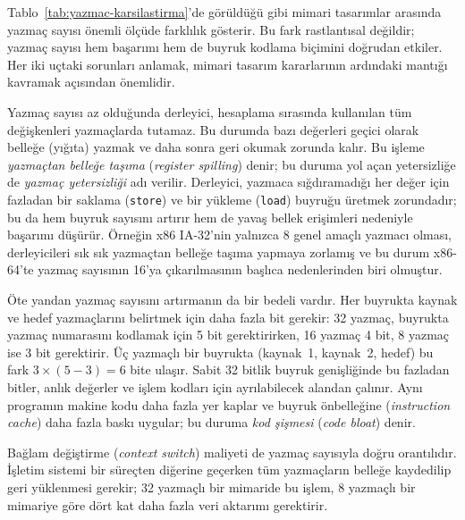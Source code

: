 Tablo~\ref{tab:yazmac-karsilastirma}'de görüldüğü gibi mimari tasarımlar arasında yazmaç sayısı önemli ölçüde farklılık gösterir. Bu fark rastlantısal değildir; yazmaç sayısı hem başarımı hem de buyruk kodlama biçimini doğrudan etkiler. Her iki uçtaki sorunları anlamak, mimari tasarım kararlarının ardındaki mantığı kavramak açısından önemlidir.

Yazmaç sayısı az olduğunda derleyici, hesaplama sırasında kullanılan tüm değişkenleri yazmaçlarda tutamaz. Bu durumda bazı değerleri geçici olarak belleğe (yığıta) yazmak ve daha sonra geri okumak zorunda kalır. Bu işleme \emph{yazmaçtan belleğe taşıma} (\emph{register spilling}) denir; bu duruma yol açan yetersizliğe de \emph{yazmaç yetersizliği} adı verilir. Derleyici, yazmaca sığdıramadığı her değer için fazladan bir saklama (\texttt{store}) ve bir yükleme (\texttt{load}) buyruğu üretmek zorundadır; bu da hem buyruk sayısını artırır hem de yavaş bellek erişimleri nedeniyle başarımı düşürür. Örneğin x86 IA-32'nin yalnızca 8 genel amaçlı yazmacı olması, derleyicileri sık sık yazmaçtan belleğe taşıma yapmaya zorlamış ve bu durum x86-64'te yazmaç sayısının 16'ya çıkarılmasının başlıca nedenlerinden biri olmuştur.

Öte yandan yazmaç sayısını artırmanın da bir bedeli vardır. Her buyrukta kaynak ve hedef yazmaçlarını belirtmek için daha fazla bit gerekir: 32 yazmaç, buyrukta yazmaç numarasını kodlamak için 5 bit gerektirirken, 16 yazmaç 4 bit, 8 yazmaç ise 3 bit gerektirir. Üç yazmaçlı bir buyrukta (kaynak~1, kaynak~2, hedef) bu fark $3 \times (5 - 3) = 6$ bite ulaşır. Sabit 32 bitlik buyruk genişliğinde bu fazladan bitler, anlık değerler ve işlem kodları için ayrılabilecek alandan çalınır. Aynı programın makine kodu daha fazla yer kaplar ve buyruk önbelleğine (\emph{instruction cache}) daha fazla baskı uygular; bu duruma \emph{kod şişmesi} (\emph{code bloat}) denir.

Bağlam değiştirme (\emph{context switch}) maliyeti de yazmaç sayısıyla doğru orantılıdır. İşletim sistemi bir süreçten diğerine geçerken tüm yazmaçların belleğe kaydedilip geri yüklenmesi gerekir; 32 yazmaçlı bir mimaride bu işlem, 8 yazmaçlı bir mimariye göre dört kat daha fazla veri aktarımı gerektirir.

\newcommand{\artii}{\textcolor{green!60!black}{\ding{51}}\;}
\newcommand{\eksii}{\textcolor{red!70!black}{\ding{55}}\;}


